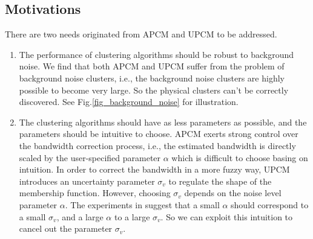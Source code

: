 \documentclass[journal]{IEEEtran}
\theoremstyle{definition}
\begin{document}
\subsection{Motivations}
\label{sec-3-1}
There are two needs originated from APCM and UPCM to be addressed.
\begin{enumerate}
\item The performance of clustering algorithms should be robust to background noise. We find that both APCM and UPCM suffer from the problem of background noise clusters, i.e., the background noise clusters are highly possible to become very large. So the physical clusters can't be correctly discovered. See Fig.\ref{fig_background_noise} for illustration.
\item The clustering algorithms should have as less parameters as possible, and the parameters should be intuitive to choose. APCM exerts strong control over the bandwidth correction process, i.e., the estimated bandwidth is directly scaled by the user-specified parameter $\alpha$ which is difficult to choose basing on intuition. In order to correct the bandwidth in a more fuzzy way, UPCM introduces an uncertainty parameter $\sigma_v$ to regulate the shape of the membership function. However, choosing $\sigma_v$ depends on the noise level parameter $\alpha$. The experiments in \cite{hou_pcm_2016} suggest that a small $\alpha$ should correspond to a small $\sigma_v$, and a large $\alpha$ to a large $\sigma_v$. So we can exploit this intuition to cancel out the parameter $\sigma_v$.
\end{enumerate}
\end{document}
